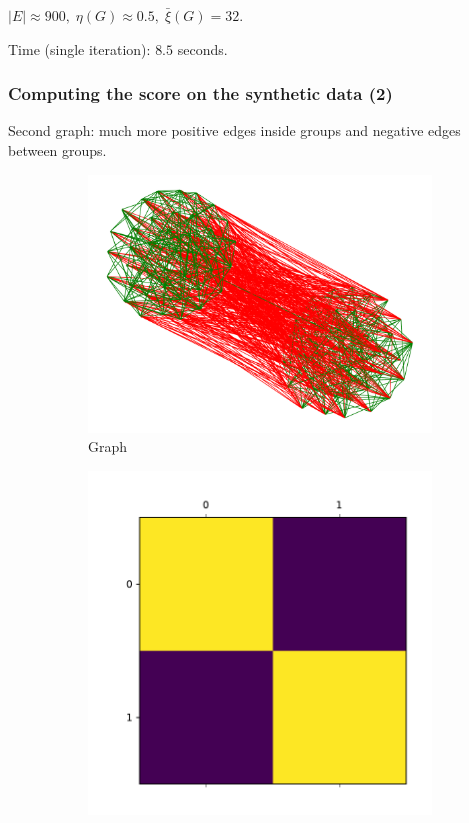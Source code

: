 \documentclass{beamer}
\begin{document}
\begin{frame}[c]
	$|E| \approx 900, \; \eta(G) \approx 0.5, \; \bar{\xi}(G) = 32$.

	Time (single iteration): $8.5 $ seconds.
\end{frame}

\begin{frame}[c]
	\frametitle{Computing the score on the synthetic data (2)}
	Second graph: much more positive edges inside groups and negative edges
	between groups.

	\begin{figure}
		\begin{center}
			\begin{subfigure}[b]{0.3\textwidth}
				\centering
				\includegraphics[width=\textwidth]{out/synthetic/graph2.pdf}
				\caption{Graph}
				\label{fig:}
			\end{subfigure}
			\begin{subfigure}[b]{0.3\textwidth}
				\centering
				\includegraphics[width=\textwidth]{out/synthetic/omega_positive2.pdf}

\end{subfigure}
\end{center}
\end{figure}
\end{frame}
\end{document}

